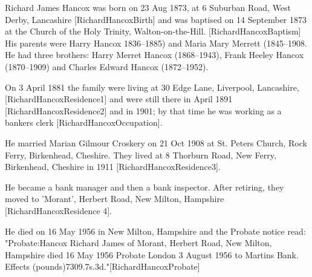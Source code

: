 
Richard James Hancox was born on 23 Aug 1873, at 6 Suburban Road, West Derby, Lancashire [RichardHancoxBirth] and was baptised on 14 September 1873 at the Church of the Holy Trinity, Walton-on-the-Hill.  [RichardHancoxBaptism]  His parents were Harry Hancox 1836--1885) and  Maria Mary Merrett (1845--1908. He had three brothers: Harry Merret Hancox (1868--1943), Frank Heeley Hancox (1870--1909) and Charles Edward Hancox (1872--1952).


On 3 April 1881 the family were living at 30 Edge Lane, Liverpool, Lancashire,[RichardHancoxResidence1] and were still there in April 1891 [RichardHancoxResidence2] and in 1901; by that time he was working as a bankers clerk [RichardHancoxOccupation].

He married Marian Gilmour Croskery on 21 Oct 1908 at St. Peters Church,  Rock Ferry, Birkenhead, Cheshire.  They lived at 8 Thorburn Road, New Ferry, Birkenhead, Cheshire in 1911 [RichardHancoxResidence3].

He became a bank manager and then a bank inspector.  After retiring, they moved to 'Morant', Herbert Road, New Milton, Hampshire [RichardHancoxResidence 4].


He died on 16 May 1956  in New Milton, Hampshire and the Probate notice read:
"Probate:Hancox Richard James of Morant, Herbert Road, New Milton, Hampshire died 16 May 1956 Probate London 3 August 1956 to Martins Bank. Effects (pounds)7309.7s.3d."[RichardHancoxProbate]
